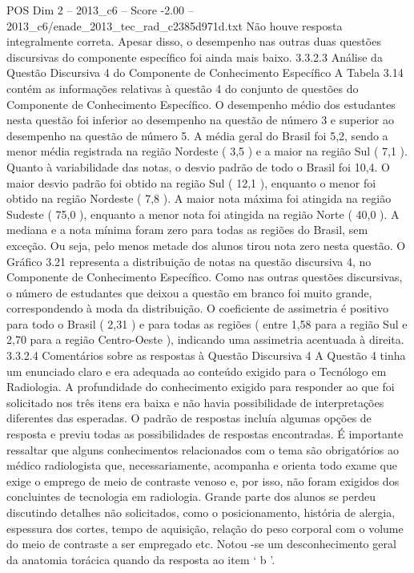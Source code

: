 \begin{textsample}{POS Dim 2 – 2013\_c6 – Score -2.00 – 2013\_c6/enade\_2013\_tec\_rad\_c2385d971d.txt}
Não houve resposta integralmente correta.
Apesar disso, o desempenho nas outras duas questões discursivas do componente específico foi ainda mais baixo. 3.3.2.3 Análise da Questão Discursiva 4 do Componente de Conhecimento Específico A Tabela 3.14 contém as informações relativas à questão 4 do conjunto de questões do Componente de Conhecimento Específico.
O desempenho médio dos estudantes nesta questão foi inferior ao desempenho na questão de número 3 e superior ao desempenho na questão de número 5.
A média geral do Brasil foi 5,2, sendo a menor média registrada na região Nordeste ( 3,5 ) e a maior na região Sul ( 7,1 ).
Quanto à variabilidade das notas, o desvio padrão de todo o Brasil foi 10,4.
O maior desvio padrão foi obtido na região Sul ( 12,1 ), enquanto o menor foi obtido na região Nordeste ( 7,8 ).
A maior nota máxima foi atingida na região Sudeste ( 75,0 ), enquanto a menor nota foi atingida na região Norte ( 40,0 ).
A mediana e a nota mínima foram zero para todas as regiões do Brasil, sem exceção.
Ou seja, pelo menos metade dos alunos tirou nota zero nesta questão.
O Gráfico 3.21 representa a distribuição de notas na questão discursiva 4, no Componente de Conhecimento Específico.
Como nas outras questões discursivas, o número de estudantes que deixou a questão em branco foi muito grande, correspondendo à moda da distribuição.
O coeficiente de assimetria é positivo para todo o Brasil ( 2,31 ) e para todas as regiões ( entre 1,58 para a região Sul e 2,70 para a região Centro-Oeste ), indicando uma assimetria acentuada à direita. 3.3.2.4 Comentários sobre as respostas à Questão Discursiva 4 A Questão 4 tinha um enunciado claro e era adequada ao conteúdo exigido para o Tecnólogo em Radiologia.
A profundidade do conhecimento exigido para responder ao que foi solicitado nos três itens era baixa e não havia possibilidade de interpretações diferentes das esperadas.
O padrão de respostas incluía algumas opções de resposta e previu todas as possibilidades de respostas encontradas.
É importante ressaltar que alguns conhecimentos relacionados com o tema são obrigatórios ao médico radiologista que, necessariamente, acompanha e orienta todo exame que exige o emprego de meio de contraste venoso e, por isso, não foram exigidos dos concluintes de tecnologia em radiologia.
Grande parte dos alunos se perdeu discutindo detalhes não solicitados, como o posicionamento, história de alergia, espessura dos cortes, tempo de aquisição, relação do peso corporal com o volume do meio de contraste a ser empregado etc.
Notou -se um desconhecimento geral da anatomia torácica quando da resposta ao item ‘ b ’.

\end{textsample}

